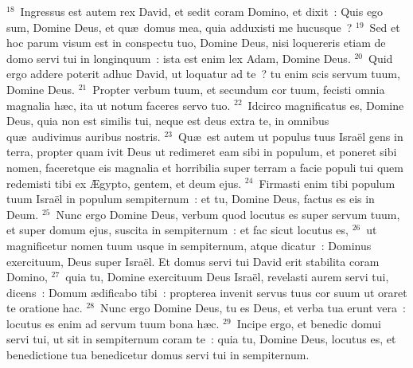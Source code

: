 ${}^{18}$~Ingressus est autem rex David, et sedit coram Domino, et dixit~: Quis ego sum, Domine Deus, et qu\ae\ domus mea, quia adduxisti me hucusque~?
${}^{19}$~Sed et hoc parum visum est in conspectu tuo, Domine Deus, nisi loquereris etiam de domo servi tui in longinquum~: ista est enim lex Adam, Domine Deus.
${}^{20}$~Quid ergo addere poterit adhuc David, ut loquatur ad te~? tu enim scis servum tuum, Domine Deus.
${}^{21}$~Propter verbum tuum, et secundum cor tuum, fecisti omnia magnalia h\ae c, ita ut notum faceres servo tuo.
${}^{22}$~Idcirco magnificatus es, Domine Deus, quia non est similis tui, neque est deus extra te, in omnibus qu\ae\ audivimus auribus nostris.
${}^{23}$~Qu\ae\ est autem ut populus tuus Isra\"el gens in terra, propter quam ivit Deus ut redimeret eam sibi in populum, et poneret sibi nomen, faceretque eis magnalia et horribilia super terram a facie populi tui quem redemisti tibi ex \AE gypto, gentem, et deum ejus.
${}^{24}$~Firmasti enim tibi populum tuum Isra\"el in populum sempiternum~: et tu, Domine Deus, factus es eis in Deum.
${}^{25}$~Nunc ergo Domine Deus, verbum quod locutus es super servum tuum, et super domum ejus, suscita in sempiternum~: et fac sicut locutus es,
${}^{26}$~ut magnificetur nomen tuum usque in sempiternum, atque dicatur~: Dominus exercituum, Deus super Isra\"el. Et domus servi tui David erit stabilita coram Domino,
${}^{27}$~quia tu, Domine exercituum Deus Isra\"el, revelasti aurem servi tui, dicens~: Domum \ae dificabo tibi~: propterea invenit servus tuus cor suum ut oraret te oratione hac.
${}^{28}$~Nunc ergo Domine Deus, tu es Deus, et verba tua erunt vera~: locutus es enim ad servum tuum bona h\ae c.
${}^{29}$~Incipe ergo, et benedic domui servi tui, ut sit in sempiternum coram te~: quia tu, Domine Deus, locutus es, et benedictione tua benedicetur domus servi tui in sempiternum.

